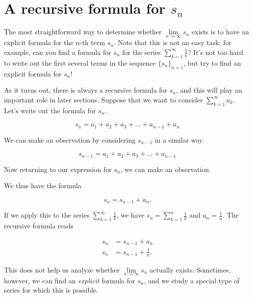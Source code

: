 \documentclass{ximera}
\begin{document}
\section*{A recursive formula for $s_n$}
The most straightforward way to determine whether $\lim\limits_{n \to \infty} s_n$ exists is to have an explicit formula for the $n$-th term $s_n$.  Note that this is not an easy task; for example, can you find a formula for $s_n$ for the series $\sum\limits_{k=1}^{\infty} \frac{1}{k}$? It's not too hard to write out the first several terms in the sequence $\{s_n\}_{n=1}$, but try to find an explicit formula for $s_n$!

As it turns out, there is always a recursive formula for $s_n$, and this will play an important role in later sections.  Suppose that we want to consider $\sum\limits_{k=1}^{\infty} a_k$.  Let's write out the formula for $s_n$.

\[
s_n = a_1+a_2+a_3+\ldots+a_{n-1}+a_n
\]

We can make an observation by considering $s_{n-1}$ in a similar way.

\[
s_{n-1} = a_1+a_2+a_3+\ldots+a_{n-1}
\]

Now returning to our expression for $s_n$, we can make an observation. 
\begin{image}
  \end{image}

We thus have the formula 

\[
s_n = s_{n-1}+a_n.
\]

If we apply this to the series $\sum\limits_{k=1}^{\infty} \frac{1}{k}$, we have $s_n = \sum\limits_{k=1}^n \frac{1}{k}$ and $a_n = \frac{1}{n}$.  The recursive formula reads 

\begin{align*}
s_n &= s_{n-1} +a_n\\
s_n &= s_{n-1} +  \frac{1}{n}.
\end{align*}

This does not help us analyze whether $\lim\limits_{n \to \infty} s_n$ actually exists.  Sometimes, however, we can find an \emph{explicit} formula for $s_n$, and we study a special type of series for which this is possible.
\end{document}
